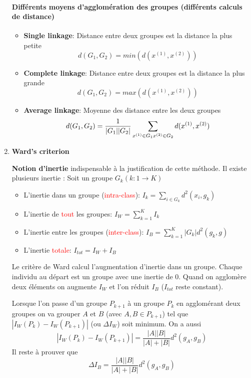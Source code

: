 \documentclass[a4paper, 11pt, onecolumn]{article}
\begin{document}
\begin{enumerate}
\paragraph{Différents moyens d'agglomération des groupes (différents calculs de distance)}
\begin{itemize}
\item \textbf{Single linkage}: Distance entre deux groupes est la distance la plus petite
$$d(G_1,G_2) = min(d(x^{(1)}, x^{(2)}))$$
\item \textbf{Complete linkage}: Distance entre deux groupes est la distance la plus grande
$$d(G_1,G_2) = max(d(x^{(1)}, x^{(2)}))$$
\item \textbf{Average linkage}: Moyenne des distance entre les deux groupes
$$d(G_1,G_2) = \frac{1}{|G_1||G_2|}\sum_{x^{(1)} \in G_1\\x^{(2)} \in G_2} d(x^{(1)}, x^{(2)})$$
\end{itemize}

\item \textbf{Ward's criterion}

\begin{framed}
  \textbf{Notion d'inertie} indispensable à la justification de cette méthode. Il existe plusieurs
  inertie :
Soit un groupe $G_k (k: 1\rightarrow K)$
\begin{itemize}
  \item L'inertie dans un groupe (\textcolor{red}{intra-class}): $I_k = \sum_{i \in G_k}d^2(x_i,g_k)$
  \item L'inertie de \textcolor{red}{tout} les groupes: $I_W = \sum_{k=1}^{K} I_k$
  \item L'inertie entre les groupes (\textcolor{red}{inter-class}): $I_B = \sum_{k=1}^{K}|G_k|d^2(g_k,g)$
  \item L'inertie \textcolor{red}{totale}: $I_{tot} = I_W + I_B$
\end{itemize}
\end{framed}

Le critère de Ward calcul l'augmentation d'inertie dans un groupe. Chaque individu au départ est un groupe avec une inertie de 0. Quand on agglomère deux éléments on augmente $I_W$ et l'on réduit $I_B$ ($I_{tot}$ reste constant).

Lorsque l'on passe d'un groupe $P_{k+1}$ à un groupe $P_{k}$ en agglomérant deux groupes on va grouper $A$ et $B$ (avec $A,B \in P_{k+1}$) tel que $|I_W(P_k)-I_W(P_{k+1})|$ (ou $\Delta I_W$) soit minimum. On a aussi 
$$|I_W(P_k)-I_W(P_{k+1})| = \frac{|A||B|}{|A|+|B|}d^2(g_A, g_B)$$
Il reste à prouver que
$$\Delta I_B = \frac{|A||B|}{|A|+|B|}d^2(g_A, g_B)$$


\end{enumerate}
\end{document}
